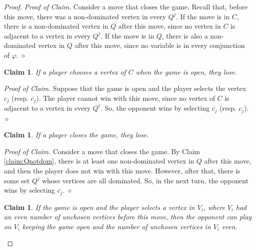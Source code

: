 \documentclass[12pt]{article}
\newtheorem{claim}[theorem]{Claim}
\newcommand{\qedclaim}{\hfill $\diamond$ \medskip}
\newenvironment{proofclaim}{\noindent\emph{Proof of Claim.}}{\qedclaim}
\begin{document}
\begin{proof}
\begin{proofclaim}
Consider a move that closes the game. Recall that, before this move, there was a non-dominated vertex in every $Q^j$.
If the move is in $C$, there is a non-dominated vertex in $Q$ after this move, since no vertex in $C$ is adjacent to a vertex in every $Q^j$.
If the move is in $Q$, there is also a non-dominated vertex in $Q$ after this move, since no variable is in every conjunction of $\varphi$.
\end{proofclaim}

\begin{claim}
\label{claim:cantplayinC}
If a player chooses a vertex of $C$ when the game is open, they lose.
\end{claim}

\begin{proofclaim}
Suppose that the game is open and the player selects the vertex $c_j$ (resp. $\overline{c_j}$). The player cannot win with this move, since no vertex of $C$ is adjacent to a vertex in every $Q^\ell$. So, the opponent wins by selecting $\overline{c_j}$ (resp. $c_j$).
\end{proofclaim}

\begin{claim}
\label{claim:wincond}
If a player closes the game, they lose.
\end{claim}

\begin{proofclaim}
Consider a move that closes the game.
By Claim \ref{claim:Qnotdom}, there is at least one non-dominated vertex in $Q$ after this move, and then the player does not win with this move. However, after that, there is some set $Q^j$ whose vertices are all dominated. So, in the next turn, the opponent wins by selecting $\overline{c_j}$.
\end{proofclaim}


\begin{claim}
\label{claim:skip}
If the game is open and the player selects a vertex in $V_i$, where $V_i$ had an even number of unchosen vertices before this move, then the opponent can play on $V_i$ keeping the game open and the number of unchosen vertices in $V_i$ even.
\end{claim}


\end{proof}
\end{document}

